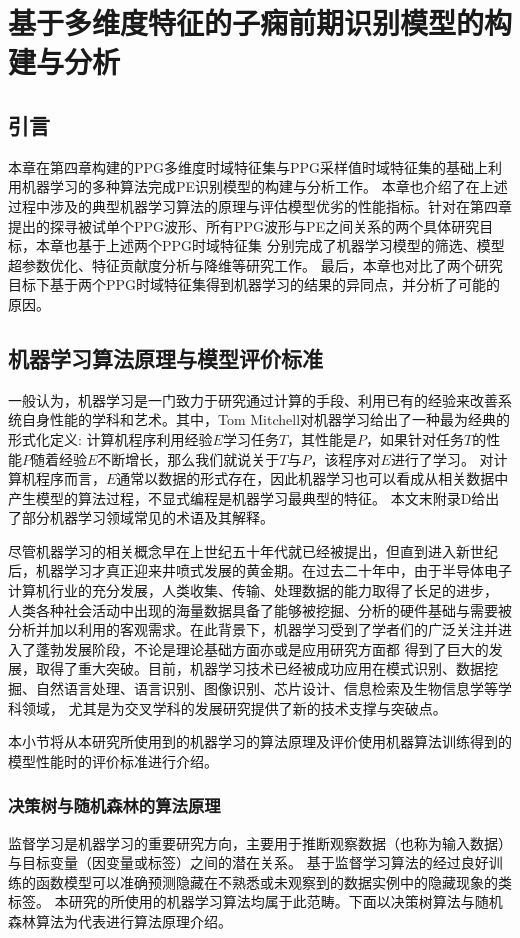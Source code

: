\chapter{基于多维度特征的子痫前期识别模型的构建与分析}
\section{引言}
本章在第四章构建的PPG多维度时域特征集与PPG采样值时域特征集的基础上利用机器学习的多种算法完成PE识别模型的构建与分析工作。
本章也介绍了在上述过程中涉及的典型机器学习算法的原理与评估模型优劣的性能指标。针对在第四章提出的探寻被试单个PPG波形、所有PPG波形与PE之间关系的两个具体研究目标，本章也基于上述两个PPG时域特征集
分别完成了机器学习模型的筛选、模型超参数优化、特征贡献度分析与降维等研究工作。
最后，本章也对比了两个研究目标下基于两个PPG时域特征集得到机器学习的结果的异同点，并分析了可能的原因。

\section{机器学习算法原理与模型评价标准}
一般认为，机器学习是一门致力于研究通过计算的手段、利用已有的经验来改善系统自身性能的学科和艺术\cite{Zhou2016,Aurélien2018}。其中，Tom Mitchell对机器学习给出了一种最为经典的形式化定义:
计算机程序利用经验$E$学习任务$T$，其性能是$P$，如果针对任务$T$的性能$P$随着经验$E$不断增长，那么我们就说关于$T$与$P$，该程序对$E$进行了学习\cite{mitchell1997,Zhou2016}。
对计算机程序而言，$E$通常以数据的形式存在，因此机器学习也可以看成从相关数据中产生模型的算法过程，不显式编程是机器学习最典型的特征。
本文末附录D给出了部分机器学习领域常见的术语及其解释。

尽管机器学习的相关概念早在上世纪五十年代就已经被提出，但直到进入新世纪后，机器学习才真正迎来井喷式发展的黄金期。在过去二十年中，由于半导体电子计算机行业的充分发展，人类收集、传输、处理数据的能力取得了长足的进步，
人类各种社会活动中出现的海量数据具备了能够被挖掘、分析的硬件基础与需要被分析并加以利用的客观需求。在此背景下，机器学习受到了学者们的广泛关注并进入了蓬勃发展阶段，不论是理论基础方面亦或是应用研究方面都
得到了巨大的发展，取得了重大突破。目前，机器学习技术已经被成功应用在模式识别、数据挖掘、自然语言处理、语言识别、图像识别、芯片设计、信息检索及生物信息学等学科领域，
尤其是为交叉学科的发展研究提供了新的技术支撑与突破点\cite{Zhou2016,Aurélien2018,Li2017}。   

本小节将从本研究所使用到的机器学习的算法原理及评价使用机器算法训练得到的模型性能时的评价标准进行介绍。
\subsection{决策树与随机森林的算法原理}
监督学习是机器学习的重要研究方向，主要用于推断观察数据（也称为输入数据）与目标变量（因变量或标签）之间的潜在关系。
基于监督学习算法的经过良好训练的函数模型可以准确预测隐藏在不熟悉或未观察到的数据实例中的隐藏现象的类标签。
本研究的所使用的机器学习算法均属于此范畴。下面以决策树算法与随机森林算法为代表进行算法原理介绍。

